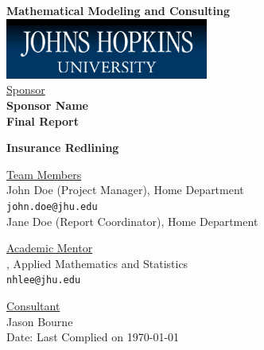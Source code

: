 \documentclass[oneside,12pt]{report}
\begin{document}
\def\thefootnote{\fnsymbol{footnote}}

\thispagestyle{empty}

\def\shiftdowna{0.32in}  %
\def\shiftdownb{0.22in}  %


\begin{center}
\textbf{{\large Mathematical Modeling and Consulting }}\\

\vspace \shiftdowna
\includegraphics[width=0.5\textwidth]{jhu.png}\\

\vspace \shiftdowna
\underline {Sponsor}\\ 
\vspace{5pt}
\textbf{\large Sponsor Name} \\
\vspace\shiftdowna
\textbf{{Final Report}}

\vspace \shiftdowna
\textbf{{\Large Insurance Redlining}}

\vspace{0.35in}
\underline {Team Members}\\
\vspace{5pt}
John Doe (Project Manager), Home Department\\
\texttt{john.doe@jhu.edu} \\
\vspace{10pt}
Jane Doe (Report Coordinator), Home Department

\vspace \shiftdownb
\underline {Academic Mentor} \\
\vspace{5pt}
, Applied Mathematics and Statistics\\
\texttt{nhlee@jhu.edu}

\vspace \shiftdownb 
\underline {Consultant}\\
\vspace{5pt}
Jason Bourne\\

\vspace \shiftdowna
Date: Last Complied on \today

\end{center}
\end{document}
